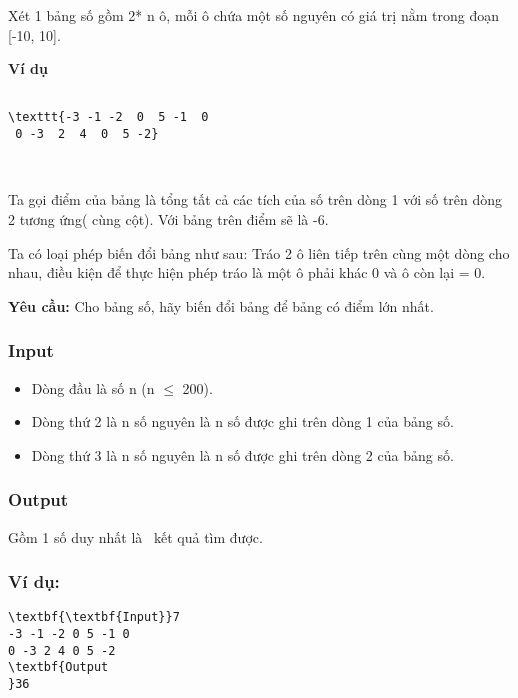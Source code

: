 

Xét 1 bảng số gồm 2* n ô, mỗi ô chứa một số nguyên có giá trị nằm trong đoạn [-10, 10].

\textbf{Ví dụ }
\begin{verbatim}

\texttt{-3 -1 -2  0  5 -1  0
 0 -3  2  4  0  5 -2}\end{verbatim}

 

Ta gọi điểm của bảng là tổng tất cả các tích của số trên dòng 1 với số trên dòng 2 tương ứng( cùng cột). Với bảng trên điểm sẽ là -6.

Ta có loại phép biến đổi bảng như sau: Tráo 2 ô liên tiếp trên cùng một dòng cho nhau, điều kiện để thực hiện phép tráo là một ô phải khác 0 và ô còn lại = 0.

\textbf{Yêu cầu: } Cho bảng số, hãy biến đổi bảng để bảng có điểm lớn nhất.

\subsubsection{Input}
\begin{itemize}
	\item Dòng đầu là số n (n $\le$  200).
	\item Dòng thứ 2 là n số nguyên là n số được ghi trên dòng 1 của bảng số.
	\item Dòng thứ 3 là n số nguyên là n số được ghi trên dòng 2 của bảng số.
\end{itemize}

\subsubsection{Output}

Gồm 1 số duy nhất là  kết quả tìm được.

\subsubsection{Ví dụ:}
\begin{verbatim}
\textbf{\textbf{Input}}7
-3 -1 -2 0 5 -1 0
0 -3 2 4 0 5 -2
\textbf{Output
}36 \end{verbatim}

